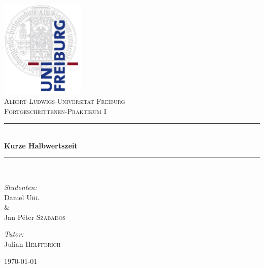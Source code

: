 
\begin{titlepage}

\begin{center}



\includegraphics[width=0.3\textwidth]{Bilder/logo}\\[1.2cm]    

\textsc{\LARGE Albert-Ludwigs-Universit\"at Freiburg}\\[1.5cm]

\textsc{\Large Fortgeschrittenen-Praktikum I}\\[0.5cm]



\newcommand{\HRule}{\rule{\linewidth}{0.5mm}}
\HRule \\[0.4cm]
{ \huge \bfseries Kurze Halbwertszeit}\\[0.4cm]

\HRule \\[1.5cm]


\begin{minipage}{0.4\textwidth}
\begin{flushleft} \large
\emph{Studenten:}\\
Daniel \textsc{Uhl}\\ \setlength{\parindent}{1.25cm} \& 
\setlength{\parindent}{0cm} \\ Jan P\'eter \textsc{Szabados} 
\end{flushleft}
\end{minipage}
\hfill
\begin{minipage}{0.4\textwidth}
\begin{flushright} \large
\emph{Tutor:} \\
Julian \textsc{Helfferich}
\end{flushright}
\end{minipage}

\vfill


{\large \today}

\end{center}

\end{titlepage}